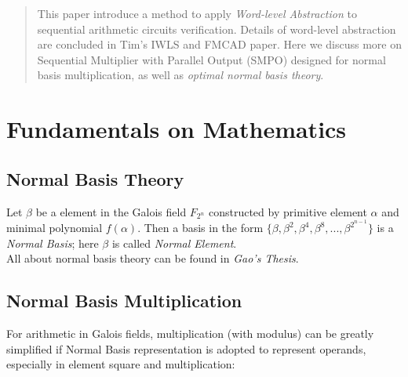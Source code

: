 \documentclass[conference]{IEEEtran}
\begin{document}





%
\IEEEpeerreviewmaketitle

\begin{abstract}
This paper introduce a method to apply \emph{Word-level Abstraction} to sequential arithmetic circuits verification.
Details of word-level abstraction are concluded in Tim's IWLS and FMCAD paper. Here we discuss more on 
Sequential Multiplier with Parallel Output (SMPO) designed for normal basis multiplication, as well as \emph{optimal 
normal basis theory}.
\end{abstract}


\section{Fundamentals on Mathematics}
	\subsection{Normal Basis Theory}
Let $\beta$ be a element in the Galois field $F_{2^n}$ constructed by primitive element $\alpha$ and minimal polynomial 
$f(\alpha)$. Then a basis in the form $\{\beta, \beta^2, \beta^4, \beta^8, ... ,\beta^{2^{n-1}}\}$ is a
\emph{Normal Basis}; here $\beta$ is called \emph{Normal Element}.\\

All about normal basis theory can be found in \textit{Gao's Thesis}. \cite{Gao}

	\subsection{Normal Basis Multiplication}
For arithmetic in Galois fields, multiplication (with modulus) can be greatly simplified if Normal Basis representation 
is adopted to represent operands, especially in element square and multiplication:\\
\end{document}
